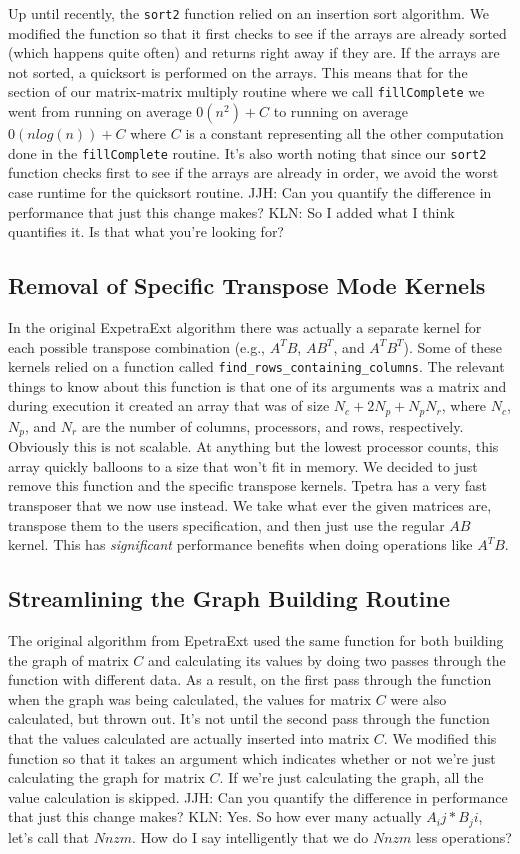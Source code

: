 \documentclass[pdf,12pt, strict]{SANDreport}
\newcommand{\JJH}[1]{\textcolor{jhuGreen}{JJH: #1}}
\newcommand{\KLN}[1]{\textcolor{klnBlue}{KLN: #1}}
\begin{document}
Up until recently, the \verb!sort2! function relied on an insertion sort algorithm. We modified the function so that it first 
checks to see if the arrays are already sorted (which happens quite often) and returns right away if they are. 
If the arrays are not sorted, a quicksort is performed on the arrays. This means that for the section of our matrix-matrix
multiply routine where we call \verb!fillComplete! we went from running on average $0(n^2)+C$ to running on average
$0(nlog(n))+C$ where $C$ is a constant representing all the other computation done in the \verb!fillComplete! routine.
It's also worth noting that since our \verb!sort2! function checks first to see if the arrays are already in order, we avoid
the worst case runtime for the quicksort routine.
\JJH{Can you quantify the difference in performance that just this change makes?}
\KLN{So I added what I think quantifies it. Is that what you're looking for?}

\subsection{Removal of Specific Transpose Mode Kernels}
In the original ExpetraExt algorithm there was actually a separate kernel for each possible transpose combination 
(e.g., $A^TB$, $AB^T$, and $A^TB^T$).
Some of these kernels relied on a function called \verb!find_rows_containing_columns!. The relevant things to know about this 
function is that one of its arguments was a matrix and during execution it created an array that was of size 
$N_c+ 2N_p + N_p N_r$, where
$N_c$, $N_p$, and $N_r$ are the number of columns, processors, and rows, respectively.
Obviously this is not scalable. At anything but the lowest processor counts, this array quickly balloons to a size that 
won't fit in memory. We decided to just remove this function and the specific transpose kernels. Tpetra has a very fast 
transposer that we now use instead. We take what ever the given matrices are, transpose them to the users specification, 
and then just use the regular $AB$ kernel. This has \emph{significant} performance benefits when doing operations like 
$A^TB$.


\subsection{Streamlining the Graph Building Routine}
The original algorithm from EpetraExt used the same function for both building the graph of matrix $C$ and calculating its 
values by doing two passes through the function with different data. 
As a result, on the first pass through the function when the graph was being calculated, the values for matrix $C$ were also 
calculated, but thrown out. It's not until the second pass through the function 
that the values calculated are actually inserted into matrix $C$. We modified this function so that it
takes an argument which indicates whether or not we're just calculating the graph for matrix $C$. If we're just calculating 
the graph, all the value calculation is skipped.
\JJH{Can you quantify the difference in performance that just this change makes?}
\KLN{Yes. So how ever many actually $A_ij*B_ji$, let's call that $Nnzm$. How do I say intelligently that we do
$Nnzm$ less operations?}
\end{document}
